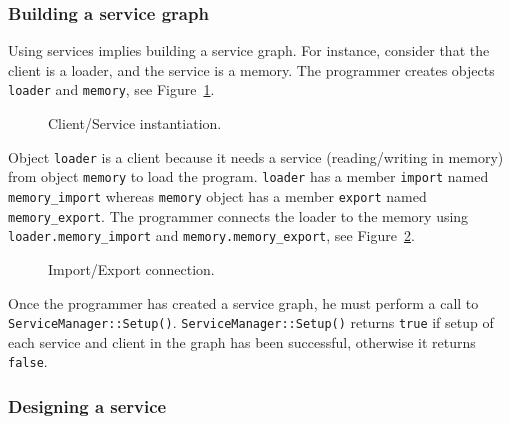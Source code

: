 \subsubsection{Building a service graph}
\label{tms320c3x_building_a_service_graph}

Using services implies building a service graph.
For instance, consider that the client is a loader, and the service is a memory.
The programmer creates objects \texttt{loader} and \texttt{memory}, see Figure~\ref{fig:tms320c3x_service_instanciation}.

\begin{figure}[h]
  \begin{center}
    
    \caption{\label{fig:tms320c3x_service_instanciation} Client/Service instantiation.}
  \end{center}
\end{figure}

Object \texttt{loader} is a client because it needs a service (reading/writing in memory) from object \texttt{memory} to load the program.
\texttt{loader} has a member \texttt{import} named \texttt{memory\_import} whereas \texttt{memory} object has a member \texttt{export} named \texttt{memory\_export}.
The programmer connects the loader to the memory using \texttt{loader.memory\_import} and \texttt{memory.memory\_export}, see Figure~\ref{fig:tms320c3x_service_connection}.

\begin{figure}[h]
  \begin{center}
    
    \caption{\label{fig:tms320c3x_service_connection} Import/Export connection.}
  \end{center}
\end{figure}

Once \hfill the \hfill programmer \hfill has \hfill created \hfill a \hfill service \hfill graph, \hfill he \hfill must \hfill perform \hfill a \hfill call \hfill to \hfill \texttt{ServiceManager::Setup()}.
\texttt{ServiceManager::Setup()} returns \texttt{true} if setup of each service and client in the graph has been successful, otherwise it returns \texttt{false}.

\subsubsection{Designing a service}

